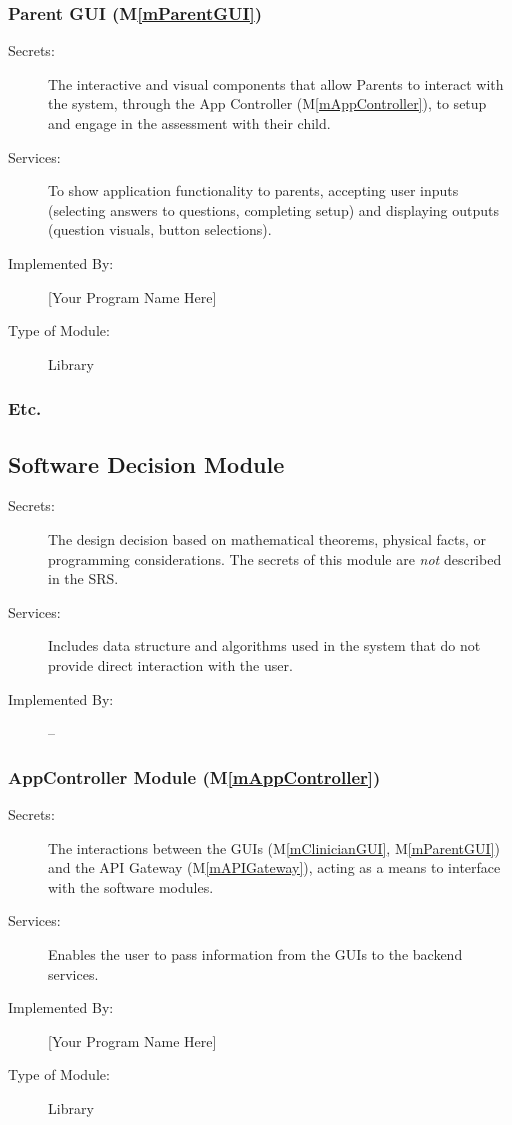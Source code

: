 \documentclass[12pt, titlepage]{article}
\newcommand{\mref}[1]{M\ref{#1}}
\begin{document}
\subsubsection{Parent GUI (\mref{mParentGUI})}

\begin{description}
\item[Secrets:]The interactive and visual components that allow Parents to interact with the system, through the App Controller (\mref{mAppController}),
               to setup and engage in the assessment with their child.
\item[Services:] To show application functionality to parents, accepting user inputs (selecting answers to questions,
                 completing setup) and displaying outputs (question visuals, button selections).
\item[Implemented By:] [Your Program Name Here]
\item[Type of Module:] Library
\end{description}

\subsubsection{Etc.}


\subsection{Software Decision Module}

\begin{description}
\item[Secrets:] The design decision based on mathematical theorems, physical
  facts, or programming considerations. The secrets of this module are
  \emph{not} described in the SRS.
\item[Services:] Includes data structure and algorithms used in the system that
  do not provide direct interaction with the user. 
\item[Implemented By:] --
\end{description}

\subsubsection{AppController Module (\mref{mAppController})}

\begin{description}
  \item[Secrets:]The interactions between the GUIs (\mref{mClinicianGUI}, \mref{mParentGUI}) and the API Gateway (\mref{mAPIGateway}), acting as a means to interface with the software modules.
  \item[Services:]Enables the user to pass information from the GUIs to the backend services.
  \item[Implemented By:] [Your Program Name Here]
  \item[Type of Module:] Library
  \end{description}
\end{document}
